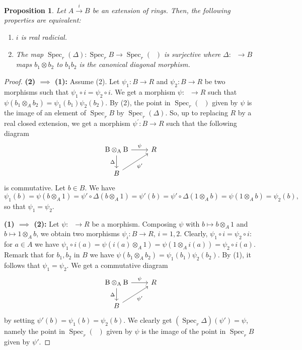 \documentclass[12pt]{amsart}
\newtheorem{prop}[thm]{Proposition}
\theoremstyle{definition}
\DeclareMathOperator{\Sp}{Spec}
\DeclareMathOperator{\BAB}{B\otimes_{A} B}
\begin{document}
\begin{prop}\label{rrsaturdeux}
Let $A\xrightarrow{i}  B$ be an extension of rings. Then, the following properties are equivalent:
\begin{enumerate}
\item $i$ is  real radicial.
\item The map $\Sp_r (\Delta):\Sp_r B\to \Sp_r (\BAB)$ is surjective where $\Delta:\BAB\to B$ maps $b_1\otimes b_2$ to $b_1b_2$ is the canonical diagonal morphism.
\end{enumerate}
\end{prop}
\begin{proof}
\textbf{(2) $\implies$ (1):}
Assume (2). Let $\psi_1:B\to R$ and $\psi_2:B\to R$ be two morphisms 
such that $\psi_1\circ  i=\psi_2\circ i$. We get a morphism $\psi:\BAB\to R$ such that $\psi(b_1\otimes_A b_2)=\psi_1(b_1)\psi_2(b_2)$. By (2), the point in $\Sp_r(\BAB)$ given by $\psi$ is the image of an element of $\Sp_r B$ by $\Sp_r(\Delta)$. So, up to replacing $R$ by a real closed extension, we get 
a morphism $\psi^{\prime}:B\to R$ such that the following diagram
$$\begin{tikzcd}
\BAB \arrow[d, "\Delta" '] \arrow[r,"\psi"] & R\\
B \arrow[ur,,"\psi'" ',] &
\end{tikzcd}$$
is commutative. Let $b\in B$. We have 
$$\psi_1(b)=\psi(b\otimes_A 1)=\psi'\circ \Delta(b\otimes_A 1)=\psi'(b)=\psi'\circ \Delta(1 \otimes_A b)=\psi(1\otimes_A b)=\psi_2(b),$$ so that $\psi_1=\psi_2$.

\textbf{(1) $\implies$ (2):}
Let $\psi:\BAB\to R$ be a morphism. Composing $\psi$ with $b\mapsto b\otimes_{A}1$ and $b\mapsto 1\otimes_{A}b$, we obtain two morphisms $\psi_i:B\to R$, $i=1,2$. Clearly, $\psi_1\circ  i=\psi_2\circ  i$: for $a\in A$ we have $\psi_1\circ i(a)=\psi( i(a)\otimes_A 1)=\psi(1\otimes_A  i(a))=\psi_2\circ  i(a)$. Remark that for $b_1,b_2$ in $B$ we have $\psi(b_1\otimes_A b_2)=\psi_1(b_1)\psi_2(b_2)$. By (1), it follows that $\psi_1=\psi_2$. We get a commutative diagram
$$\begin{tikzcd}
\BAB \arrow[d, "\Delta" '] \arrow[r,"\psi"] & R\\
B \arrow[ur,,"\psi'" ',] &
\end{tikzcd}$$
by setting $\psi'(b)=\psi_1(b)=\psi_2(b)$. We clearly get $(\Sp_r \Delta)(\psi')=\psi$, namely the point in 
$\Sp_r (\BAB)$ given by $\psi$ is the image of the point in 
$\Sp_r B$ given by $\psi'$.
\end{proof}
\end{document}
